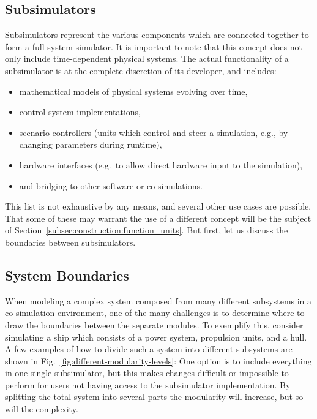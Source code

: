 \documentclass[prb,aps,showpacs,floatfix,twocolumn,10pt]{revtex4-1}
\newcommand{\sub}{subsimulator}
\newcommand{\Sub}{Subsimulator}
\theoremstyle{plain}
\theoremstyle{remark}
\begin{document}
\subsection{\Sub{}s}
\label{subsec:construction:subs}

\Sub{}s represent the various components which are connected together to form a full-system simulator.
It is important to note that this concept does not only include time-dependent physical systems.
The actual functionality of a \sub{} is at the complete discretion of its developer, and includes:
\begin{itemize}
  \item mathematical models of physical systems evolving over time,
  \item control system implementations,
  \item scenario controllers (units which control and steer a simulation, e.g., by changing parameters during runtime),
  \item hardware interfaces (e.g.\ to allow direct hardware input to the simulation),
  \item and bridging to other software or co-simulations.
\end{itemize}
This list is not exhaustive by any means, and several other use cases are possible.
That some of these may warrant the use of a different concept will be the subject of Section~\ref{subsec:construction:function_units}.
But first, let us discuss the boundaries between \sub{}s. 


\subsection{System Boundaries}
\label{subsec:construction:system_boundaries}

When modeling a complex system composed from many different subsystems in a co-simulation environment, one of the many challenges is to determine where to draw the boundaries between the separate modules.
To exemplify this, consider simulating a ship which consists of a power system, propulsion units, and a hull.
A few examples of how to divide such a system into different subsystems are shown in Fig.~\ref{fig:different-modularity-levels}:
One option is to include everything in one single \sub{}, but this makes changes difficult or impossible to perform for users not having access to the \sub{} implementation.
By splitting the total system into several parts the modularity will increase, but so will the complexity.
\end{document}

